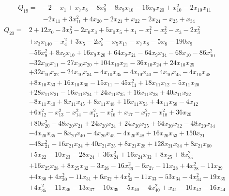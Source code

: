 \begin{equation*}\begin{aligned}
Q_{19}={}& -2-x_{1}+x_{7}x_{8}-8x_{9}^{2}-8x_{9}x_{10}-16x_{9}x_{20}+x_{10}^{2}-2x_{10}x_{11}\\
& -2x_{11}+3x_{11}^{2}+4x_{20}-2x_{21}+x_{22}-2x_{24}-x_{25}+x_{34}
\end{aligned}\end{equation*}
\begin{equation*}\begin{aligned}
Q_{20}={}& 2+12x_{0}-3x_{0}^{2}-2x_{0}x_{3}+5x_{0}x_{5}+x_{1}-x_{1}^{2}-x_{2}^{2}-x_{3}-2x_{3}^{2}\\
& +x_{3}x_{140}-x_{4}^{2}+3x_{5}-2x_{5}^{2}-x_{5}x_{17}-x_{7}x_{8}-5x_{8}-190x_{9}\\
& -56x_{9}^{2}+8x_{9}x_{10}+16x_{9}x_{20}+64x_{9}x_{21}-64x_{9}x_{34}-68x_{10}-86x_{10}^{2}\\
& -32x_{10}x_{11}-27x_{10}x_{20}+104x_{10}x_{21}-36x_{10}x_{24}+24x_{10}x_{25}\\
& +32x_{10}x_{32}-24x_{10}x_{34}-4x_{10}x_{35}-4x_{10}x_{40}-4x_{10}x_{45}-4x_{10}x_{48}\\
& +8x_{10}x_{53}+16x_{10}x_{60}-15x_{11}-45x_{11}^{2}+18x_{11}x_{12}-5x_{11}x_{20}\\
& +28x_{11}x_{21}-16x_{11}x_{24}+24x_{11}x_{25}+16x_{11}x_{28}+40x_{11}x_{32}\\
& -8x_{11}x_{40}+8x_{11}x_{45}+8x_{11}x_{48}+16x_{11}x_{53}+4x_{11}x_{58}-4x_{12}\\
& +6x_{12}^{2}-x_{13}^{2}-x_{14}^{2}-x_{15}^{2}-x_{16}^{2}+x_{17}-x_{17}^{2}-x_{18}^{2}+36x_{20}\\
& +80x_{20}^{2}-48x_{20}x_{21}+24x_{20}x_{24}+24x_{20}x_{25}+64x_{20}x_{32}-48x_{20}x_{34}\\
& -4x_{20}x_{35}-8x_{20}x_{40}-4x_{20}x_{45}-4x_{20}x_{48}+16x_{20}x_{53}+150x_{21}\\
& -48x_{21}^{2}-16x_{21}x_{24}+40x_{21}x_{25}+8x_{21}x_{28}+128x_{21}x_{34}+8x_{21}x_{60}\\
& +5x_{22}-10x_{23}-28x_{24}+36x_{24}^{2}+16x_{24}x_{32}+8x_{25}+8x_{25}^{2}\\
& +16x_{25}x_{28}+8x_{25}x_{32}-3x_{26}-16x_{26}^{2}-6x_{27}-11x_{28}+4x_{28}^{2}-11x_{29}\\
& +4x_{30}+4x_{30}^{2}-11x_{31}+6x_{32}+4x_{32}^{2}-11x_{33}-53x_{34}-4x_{34}^{2}-19x_{35}\\
& +4x_{35}^{2}-11x_{36}-13x_{37}-10x_{39}-5x_{40}-4x_{40}^{2}+x_{41}-10x_{42}-16x_{44}\\

\end{aligned}
\end{equation*}
